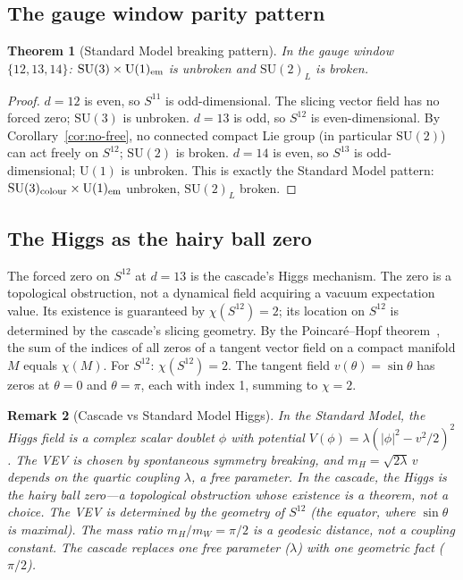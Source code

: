 \documentclass[12pt,a4paper]{article}
\newtheorem{theorem}{Theorem}[section]
\newtheorem{remark}[theorem]{Remark}
\begin{document}
\subsection{The gauge window parity pattern}

\begin{theorem}[Standard Model breaking pattern]\label{thm:breaking}
In the gauge window $\{12,13,14\}$: $\mathrm{SU}(3)\times\mathrm{U}(1)_{\rm em}$ is
unbroken and $\mathrm{SU}(2)_L$ is broken.
\end{theorem}
\begin{proof}
$d=12$ is even, so $S^{11}$ is odd-dimensional. The slicing vector field has no forced
zero; $\mathrm{SU}(3)$ is unbroken. $d=13$ is odd, so $S^{12}$ is even-dimensional.
By Corollary~\ref{cor:no-free}, no connected compact Lie group (in particular
$\mathrm{SU}(2)$) can act freely on $S^{12}$; $\mathrm{SU}(2)$ is broken. $d=14$ is
even, so $S^{13}$ is odd-dimensional; $\mathrm{U}(1)$ is unbroken. This is exactly the
Standard Model pattern: $\mathrm{SU}(3)_{\rm colour}\times\mathrm{U}(1)_{\rm em}$
unbroken, $\mathrm{SU}(2)_L$ broken.
\end{proof}

\subsection{The Higgs as the hairy ball zero}

The forced zero on $S^{12}$ at $d=13$ is the cascade's Higgs mechanism. The zero is a
topological obstruction, not a dynamical field acquiring a vacuum expectation value. Its
existence is guaranteed by $\chi(S^{12})=2$; its location on $S^{12}$ is determined by the
cascade's slicing geometry. By the Poincar\'{e}--Hopf theorem~\cite{hopf}, the sum of the
indices of all zeros of a tangent vector field on a compact manifold $M$ equals $\chi(M)$.
For $S^{12}$: $\chi(S^{12})=2$. The tangent field $v(\theta)=\sin\theta$ has zeros at
$\theta=0$ and $\theta=\pi$, each with index 1, summing to $\chi=2$.

\begin{remark}[Cascade vs Standard Model Higgs]
In the Standard Model, the Higgs field is a complex scalar doublet $\phi$ with potential
$V(\phi)=\lambda(|\phi|^2-v^2/2)^2$. The VEV is chosen by spontaneous symmetry breaking,
and $m_H=\sqrt{2\lambda}\,v$ depends on the quartic coupling $\lambda$, a free parameter.
In the cascade, the Higgs is the hairy ball zero---a topological obstruction whose existence
is a theorem, not a choice. The VEV is determined by the geometry of $S^{12}$ (the equator,
where $\sin\theta$ is maximal). The mass ratio $m_H/m_W=\pi/2$ is a geodesic distance, not
a coupling constant. The cascade replaces one free parameter ($\lambda$) with one geometric
fact ($\pi/2$).
\end{remark}
\end{document}
